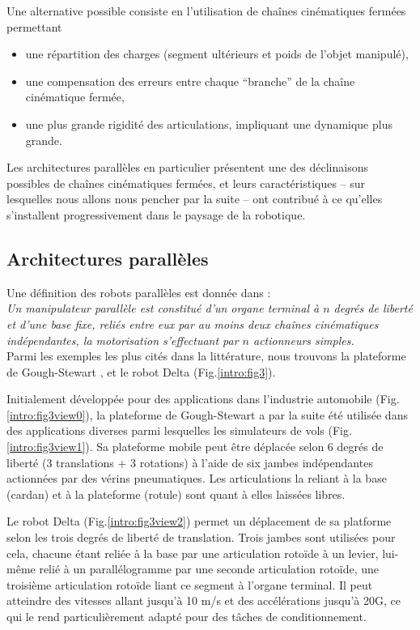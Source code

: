Une alternative possible consiste en l'utilisation de chaînes cinématiques fermées permettant
\begin{itemize}
 \item une répartition des charges (segment ultérieurs et poids de l'objet manipulé),
 \item une compensation des erreurs entre chaque ``branche'' de la chaîne cinéma\-tique fermée,
 \item une plus grande rigidité des articulations, impliquant une dynamique plus grande.
\end{itemize}

Les architectures parallèles en particulier présentent une des déclinaisons possibles de chaînes cinématiques fermées, et leurs caractéristiques -- sur lesquel\-les nous allons nous pencher par la suite -- ont contribué à ce qu'elles s'installent progressivement dans le paysage de la robotique.


\subsection{Architectures parallèles}

Une définition des robots parallèles est donnée dans \cite{merlet1997robots} :\\
{\it Un manipulateur parallèle est constitué d’un organe terminal à $n$ degrés de li\-berté et d’une base fixe, reliés entre eux par au moins deux chaînes
cinématiques indépendantes, la motorisation s’effectuant par $n$ actionneurs simples.}\\

Parmi les exemples les plus cités dans la littérature, nous trouvons la plateforme de Gough-Stewart \cite{1956:Gough}, \cite{1965:Stewart} et le robot Delta \cite{1988:Clavel} (Fig.\ref{intro:fig3}).

Initialement développée pour des applications dans l'industrie automobile (Fig.\ref{intro:fig3view0}), la plateforme de Gough-Stewart a par la suite été utilisée dans des applications diverses parmi lesquelles les simulateurs de vols (Fig.\ref{intro:fig3view1}). Sa plateforme mobile peut être déplacée selon 6 degrés de liberté (3 translations $+$ 3 rotations) à l'aide de six jambes indépendantes actionnées par des vérins pneumatiques. Les articulations la reliant à la base (cardan) et à la plateforme (rotule) sont quant à elles laissées libres.

Le robot Delta (Fig.\ref{intro:fig3view2}) permet un déplacement de sa platforme selon les trois degrés de liberté de translation. Trois jambes sont utilisées pour cela, chacune étant reliée à la base par une articulation rotoïde à un levier, lui-même relié à un parallélogramme par une seconde articulation rotoïde, une troisième articulation rotoïde liant ce segment à l'organe terminal. Il peut atteindre des vitesses allant jusqu'à 10 m/s et des accélérations jusqu'à 20G, ce qui le rend particulièrement adapté pour des tâches de conditionnement. 


